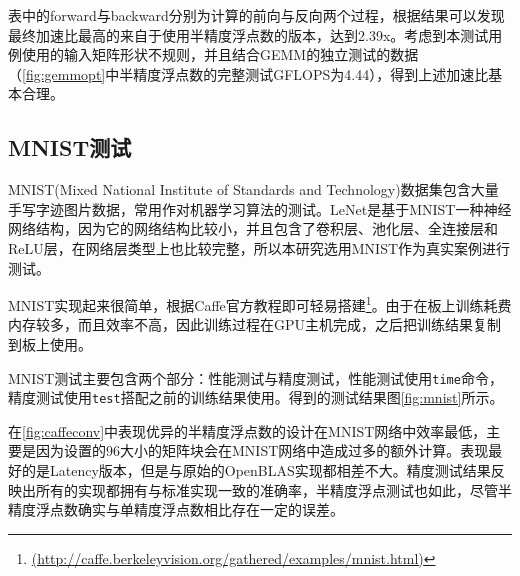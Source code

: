 表中的forward与backward分别为计算的前向与反向两个过程，根据结果可以发现最终加速比最高的来自于使用半精度浮点数的版本，达到2.39x。考虑到本测试用例使用的输入矩阵形状不规则，并且结合GEMM的独立测试的数据（\ref{fig:gemmopt}中半精度浮点数的完整测试GFLOPS为4.44），得到上述加速比基本合理。

\subsection{MNIST测试}

MNIST(Mixed National Institute of Standards and Technology)数据集包含大量手写字迹图片数据，常用作对机器学习算法的测试。LeNet\supercite{lecun1998gradient}是基于MNIST一种神经网络结构，因为它的网络结构比较小，并且包含了卷积层、池化层、全连接层和ReLU层，在网络层类型上也比较完整，所以本研究选用MNIST作为真实案例进行测试。

MNIST实现起来很简单，根据Caffe官方教程即可轻易搭建\footnote{\url{(http://caffe.berkeleyvision.org/gathered/examples/mnist.html)}}。由于在板上训练耗费内存较多，而且效率不高，因此训练过程在GPU主机完成，之后把训练结果复制到板上使用。

MNIST测试主要包含两个部分：性能测试与精度测试，性能测试使用\texttt{time}命令，精度测试使用\texttt{test}搭配之前的训练结果使用。得到的测试结果图\ref{fig:mnist}所示。

在\ref{fig:caffeconv}中表现优异的半精度浮点数的设计在MNIST网络中效率最低，主要是因为设置的96大小的矩阵块会在MNIST网络中造成过多的额外计算。表现最好的是Latency版本，但是与原始的OpenBLAS实现都相差不大。精度测试结果反映出所有的实现都拥有与标准实现一致的准确率，半精度浮点测试也如此，尽管半精度浮点数确实与单精度浮点数相比存在一定的误差。

